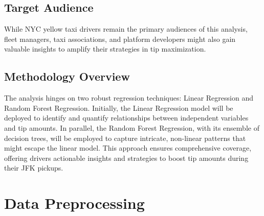 \documentclass[11pt]{article}
\begin{document}
\subsection{Target Audience}
While NYC yellow taxi drivers remain the primary audiences of this analysis, fleet managers, taxi associations, and platform developers might also gain valuable insights to amplify their strategies in tip maximization.

\subsection{Methodology Overview}
The analysis hinges on two robust regression techniques: Linear Regression and Random Forest Regression. Initially, the Linear Regression model will be deployed to identify and quantify relationships between independent variables and tip amounts. In parallel, the Random Forest Regression, with its ensemble of decision trees, will be employed to capture intricate, non-linear patterns that might escape the linear model. This approach ensures comprehensive coverage, offering drivers actionable insights and strategies to boost tip amounts during their JFK pickups.

\section{Data Preprocessing}
\end{document}
